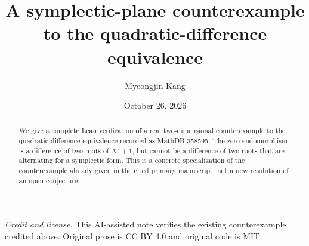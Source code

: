 \documentclass[11pt]{article}
\title{A symplectic-plane counterexample to the quadratic-difference equivalence}
\author{Myeongjin Kang}
\date{October 26, 2026}
\begin{document}
\maketitle
\begin{abstract}
We give a complete Lean verification of a real two-dimensional counterexample to the quadratic-difference equivalence recorded as MathDB 358595. The zero endomorphism is a difference of two roots of $X^2+1$, but cannot be a difference of two roots that are alternating for a symplectic form. This is a concrete specialization of the counterexample already given in the cited primary manuscript, not a new resolution of an open conjecture.
\end{abstract}
\noindent\textit{Credit and license.} This AI-assisted note verifies the existing counterexample credited above. Original prose is CC BY 4.0 and original code is MIT.
\end{document}
